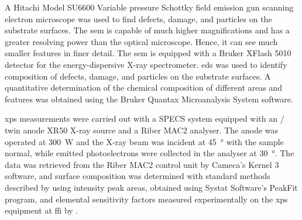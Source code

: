 A Hitachi Model SU6600 Variable pressure Schottky field emission gun scanning electron microscope was used to find defects, damage, and particles on the substrate surfaces. The \ac{sem} is capable of much higher magnifications and has a greater resolving power than the optical microscope. Hence, it can see much smaller features in finer detail. The \ac{sem} is equipped with a Bruker XFlash 5010 detector for the energy-dispersive X-ray spectrometer. \Ac{eds} was used to identify composition of defects, damage, and particles on the substrate surfaces. A quantitative determination of the chemical composition of different areas and features was obtained using the Bruker Quantax Microanalysis System software.

\Ac{xps} measurements were carried out with a SPECS system equipped with an / twin anode XR50 X-ray source and a Riber MAC2 analyser. The  anode was operated at \SI{300}{\watt} and the X-ray beam was incident at \SI{45}{\degree} with the sample normal, while emitted photoelectrons were collected in the analyser at \SI{30}{\degree}. The data was retrieved from the Riber MAC2 control unit by Cameca's Kernel 3 software, and surface composition was determined with standard methods described by \citet{moulder2000handbook} using intensity peak areas, obtained using Systat Software's PeakFit program, and elemental sensitivity factors measured experimentally on the \ac{xps} equipment at \ac{ffi} by \citet{hirsch1999x-ray}.%

